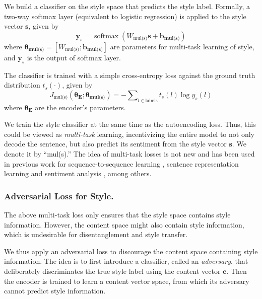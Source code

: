 \documentclass[letterpaper]{article} %
\newcommand{\loss}[1]{J_{\text{#1}}}
\newcommand{\nnweight}[1]{\bm{\theta_{\text{#1}}}}
\newcommand{\weight}[1]{W_{\text{#1}}}
\newcommand{\bias}[1]{\bm{b_{\text{#1}}}}
\begin{document}
We build a classifier on the style space that predicts the style label. Formally, a two-way softmax layer (equivalent to logistic regression) is applied to the style vector $\bm s$, given by
\begin{equation} \label{eqn:class-pred}
	\bm y_s = \operatorname{softmax}(\weight{mul(s)} \bm s + \bias{mul(s)})
\end{equation}
where $\nnweight{mul(s)}=[\weight{mul(s)}; \bias{mul(s)}]$ are parameters for multi-task learning of style, and $\bm y_s$ is the output of softmax layer.

The classifier is trained with a simple cross-entropy loss against the ground truth distribution $t_s(\cdot)$, given by
\begin{equation} \label{eqn:style-multi-task-loss}
	\loss{mul(s)}(\nnweight{E};\nnweight{mul(s)}) = - \sum\nolimits_{l\in\text{labels}} t_s(l)\log y_s(l)
\end{equation}
where $\nnweight{E}$ are the encoder's parameters.

We train the style classifier at the same time as the autoencoding loss.
Thus, this could be viewed as \textit{multi-task} learning, incentivizing the entire model to not only decode the sentence, but also predict its sentiment from the style vector $\bm  s$.
We denote it by ``mul(s).''
The idea of multi-task losses is not new and has been used in previous work for sequence-to-sequence learning \cite{luong2015multi}, sentence representation learning \cite{jernite2017discourse} and sentiment analysis \cite{balikas2017multitask}, among others.


\subsubsection{Adversarial Loss for Style.}
\label{ssec:adversarial-style-objective}

The above multi-task loss only ensures that the style space contains style information.
However, the content space might also contain style information, which is undesirable for disentanglement and style transfer.

We thus apply an adversarial loss to discourage the content space containing style information.
The idea is to first introduce a classifier, called an \textit{adversary}, that deliberately discriminates the true style label using the content vector $\bm c$.
Then the encoder is trained to learn a content vector space, from which its adversary cannot predict style information.
\end{document}
